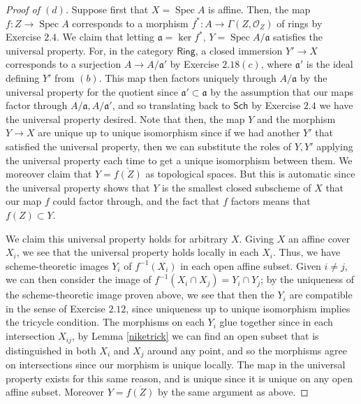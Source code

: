 \documentclass[10pt]{article}
\theoremstyle{definition}
\theoremstyle{remark}
\numberwithin{equation}{section}
\numberwithin{figure}{subsubsection}
\DeclareMathOperator{\Spec}{Spec}
\newcommand{\OO}{\mathcal{O}}
\newcommand{\red}{\mathrm{red}}
\newcommand{\Sch}{\mathsf{Sch}}
\newcommand{\Ring}{\mathsf{Ring}}
\begin{document}
\begin{proof}[Proof of $(d)$]
  Suppose first that $X = \Spec A$ is affine. Then, the map $f\colon Z \to \Spec A$ corresponds to a morphism $f^*\colon A \to \Gamma(Z,\OO_Z)$ of rings by Exercise $2.4$. We claim that letting $\mathfrak{a} = \ker f^*$, $Y = \Spec A/\mathfrak{a}$ satisfies the universal property. For, in the category $\Ring$, a closed immersion $Y' \to X$ corresponds to a surjection $A \to A/\mathfrak{a}'$ by Exercise $2.18(c)$, where $\mathfrak{a}'$ is the ideal defining $Y'$ from $(b)$. This map then factors uniquely through $A/\mathfrak{a}$ by the universal property for the quotient since $\mathfrak{a}'\subset\mathfrak{a}$ by the assumption that our maps factor through $A/\mathfrak{a},A/\mathfrak{a}'$, and so translating back to $\Sch$ by Exercise $2.4$ we have the universal property desired. Note that then, the map $Y$ and the morphism $Y \to X$ are unique up to unique isomorphism since if we had another $Y'$ that satisfied the universal property, then we can substitute the roles of $Y,Y'$ applying the universal property each time to get a unique isomorphism between them. We moreover claim that $Y = \overline{f(Z)}$ as topological spaces. But this is automatic since the universal property shows that $Y$ is the smallest closed subscheme of $X$ that our map $f$ could factor through, and the fact that $f$ factors means that $f(Z) \subset Y$.
  \par We claim this universal property holds for arbitrary $X$. Giving $X$ an affine cover $X_i$, we see that the universal property holds locally in each $X_i$. Thus, we have scheme-theoretic images $Y_i$ of $f^{-1}(X_i)$ in each open affine subset. Given $i \ne j$, we can then consider the image of $f^{-1}(X_i \cap X_j) = Y_i \cap Y_j$; by the uniqueness of the scheme-theoretic image proven above, we see that then the $Y_i$ are compatible in the sense of Exercise $2.12$, since uniqueness up to unique isomorphism implies the tricycle condition. The morphisms on each $Y_i$ glue together since in each intersection $X_{ij}$, by Lemma \ref{niketrick} we can find an open subset that is distinguished in both $X_i$ and $X_j$ around any point, and so the morphisms agree on intersections since our morphism is unique locally. The map in the universal property exists for this same reason, and is unique since it is unique on any open affine subset. Moreover $Y = \overline{f(Z)}$ by the same argument as above.

\end{proof}
\end{document}
